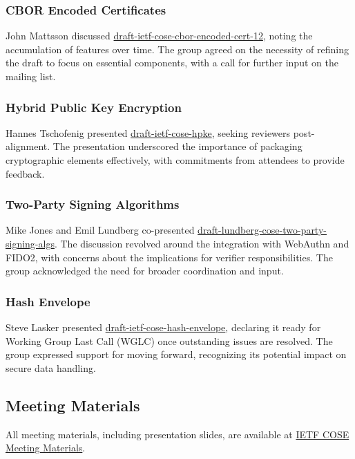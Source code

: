 \documentclass{article}
\begin{document}
\subsubsection{CBOR Encoded Certificates}
John Mattsson discussed \href{https://datatracker.ietf.org/doc/html/draft-ietf-cose-cbor-encoded-cert-12}{draft-ietf-cose-cbor-encoded-cert-12}, noting the accumulation of features over time. The group agreed on the necessity of refining the draft to focus on essential components, with a call for further input on the mailing list.

\subsubsection{Hybrid Public Key Encryption}
Hannes Tschofenig presented \href{https://datatracker.ietf.org/doc/html/draft-ietf-cose-hpke}{draft-ietf-cose-hpke}, seeking reviewers post-alignment. The presentation underscored the importance of packaging cryptographic elements effectively, with commitments from attendees to provide feedback.

\subsubsection{Two-Party Signing Algorithms}
Mike Jones and Emil Lundberg co-presented \href{https://datatracker.ietf.org/doc/html/draft-lundberg-cose-two-party-signing-algs}{draft-lundberg-cose-two-party-signing-algs}. The discussion revolved around the integration with WebAuthn and FIDO2, with concerns about the implications for verifier responsibilities. The group acknowledged the need for broader coordination and input.

\subsubsection{Hash Envelope}
Steve Lasker presented \href{https://datatracker.ietf.org/doc/html/draft-ietf-cose-hash-envelope}{draft-ietf-cose-hash-envelope}, declaring it ready for Working Group Last Call (WGLC) once outstanding issues are resolved. The group expressed support for moving forward, recognizing its potential impact on secure data handling.

\subsection{Meeting Materials}
All meeting materials, including presentation slides, are available at \href{https://datatracker.ietf.org/meeting/122/session/cose}{IETF COSE Meeting Materials}.
\end{document}
